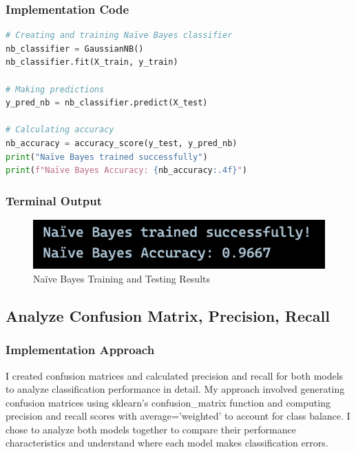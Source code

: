 \documentclass[12pt,a4paper]{article}
\begin{document}
\newpage
\subsubsection{Implementation Code}
\begin{lstlisting}[language=Python, caption=Use Naive Bayes to Classify Data]
# Creating and training Naïve Bayes classifier
nb_classifier = GaussianNB()
nb_classifier.fit(X_train, y_train)

# Making predictions
y_pred_nb = nb_classifier.predict(X_test)

# Calculating accuracy
nb_accuracy = accuracy_score(y_test, y_pred_nb)
print("Naïve Bayes trained successfully")
print(f"Naïve Bayes Accuracy: {nb_accuracy:.4f}")
\end{lstlisting}

\subsubsection{Terminal Output}

\begin{figure}[h!]
    \centering
    \includegraphics[width=\textwidth]{Figures/NBTrain.png}
    \caption{Na\"{i}ve Bayes Training and Testing Results}
\end{figure}

\subsection{Analyze Confusion Matrix, Precision, Recall}

\subsubsection{Implementation Approach}
I created confusion matrices and calculated precision and recall for both models to analyze classification performance in detail. My approach involved generating confusion matrices using sklearn's confusion\_matrix function and computing precision and recall scores with average='weighted' to account for class balance. I chose to analyze both models together to compare their performance characteristics and understand where each model makes classification errors.

\newpage
\end{document}
